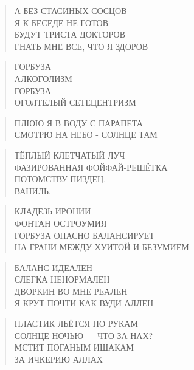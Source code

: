 \poemtitle{***}
\begin{verse}
А БЕЗ СТАСИНЫХ СОСЦОВ\\
Я К БЕСЕДЕ НЕ ГОТОВ\\
БУДУТ ТРИСТА ДОКТОРОВ\\
ГНАТЬ МНЕ ВСЕ, ЧТО Я ЗДОРОВ
\end{verse}

\poemtitle{***}
\begin{verse}
ГОРБУЗА\\
АЛКОГОЛИЗМ\\
ГОРБУЗА\\
ОГОЛТЕЛЫЙ СЕТЕЦЕНТРИЗМ
\end{verse}

\poemtitle{***}
\begin{verse}
ПЛЮЮ Я В ВОДУ С ПАРАПЕТА\\
СМОТРЮ НА НЕБО - СОЛНЦЕ ТАМ
\end{verse}

\poemtitle{***}
\begin{verse}
ТЁПЛЫЙ КЛЕТЧАТЫЙ ЛУЧ\\
ФАЗИРОВАННАЯ ФОЙФАЙ-РЕШЁТКА\\
ПОТОМСТВУ ПИЗДЕЦ.\\
ВАНИЛЬ.
\end{verse}

\poemtitle{***}
\begin{verse}
КЛАДЕЗЬ ИРОНИИ\\
ФОНТАН ОСТРОУМИЯ\\
ГОРБУЗА ОПАСНО БАЛАНСИРУЕТ\\
НА ГРАНИ МЕЖДУ ХУИТОЙ И БЕЗУМИЕМ
\end{verse}

\poemtitle{***}
\begin{verse}
БАЛАНС ИДЕАЛЕН\\
СЛЕГКА НЕНОРМАЛЕН\\
ДВОРКИН ВО МНЕ РЕАЛЕН\\
Я КРУТ ПОЧТИ КАК ВУДИ АЛЛЕН
\end{verse}

\poemtitle{***}
\begin{verse}
ПЛАСТИК ЛЬЁТСЯ ПО РУКАМ\\
СОЛНЦЕ НОЧЬЮ — ЧТО ЗА НАХ?\\
МСТИТ ПОГАНЫМ ИШАКАМ\\
ЗА ИЧКЕРИЮ АЛЛАХ
\end{verse}

